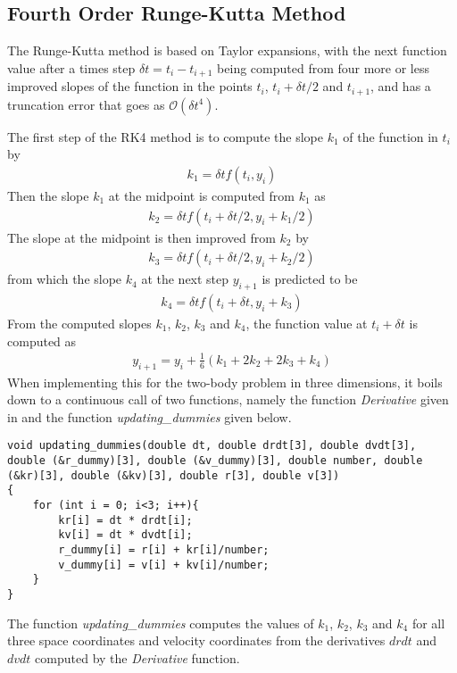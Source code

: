 \subsection{Fourth Order Runge-Kutta Method}
\label{sec:methodRK4}
The Runge-Kutta method is based on Taylor expansions, with the next function value after a times step $\delta t = t_i - t_{i+1}$ being computed from four more or less improved slopes of the function in the points $t_i$, $t_i + \delta t /2$ and $t_{i+1}$, and has a truncation error that goes as $\mathcal{O}(\delta t^4)$. \cite[p. 252]{CompLectureNotes}
  
The first step of the RK4 method is to compute the slope $k_1$ of the function in $t_i$ by
\begin{align*}
	k_1 = \delta t f(t_i , y_i)
\end{align*}
Then the slope $k_1$ at the midpoint is computed from $k_1$ as
\begin{align*}
	k_2 = \delta t f(t_i + \delta t /2, y_i + k_1 /2 )
\end{align*}
The slope at the midpoint is then improved from $k_2$ by
\begin{align*}
	k_3 = \delta t f(t_i + \delta t /2, y_i + k_2 /2 )
\end{align*}
from which the slope $k_4$ at the next step $y_{i+1}$ is predicted to be
\begin{align*}
	k_4 = \delta t f(t_i + \delta t, y_i +k_3 )
\end{align*}
From the computed slopes $k_1$, $k_2$, $k_3$ and $k_4$, the function value at $t_i + \delta t$ is computed as
\begin{align}
 y_{i+1} = y_i + \frac{1}{6} (k_1 + 2k_2 + 2k_3 +k_4 )
 \label{eq:RK4nextxtep1}
\end{align}
When implementing this for the two-body problem in three dimensions, it boils down to a continuous call of two functions, namely the function 
\textit{Derivative} given in 
 and the function 
\textit{updating\_dummies} given below.
\begin{lstlisting}
void updating_dummies(double dt, double drdt[3], double dvdt[3], double (&r_dummy)[3], double (&v_dummy)[3], double number, double (&kr)[3], double (&kv)[3], double r[3], double v[3])
{
    for (int i = 0; i<3; i++){
        kr[i] = dt * drdt[i];
        kv[i] = dt * dvdt[i];
        r_dummy[i] = r[i] + kr[i]/number;
        v_dummy[i] = v[i] + kv[i]/number;
    }
}
\end{lstlisting}
The function \textit{updating\_dummies} computes the values of $k_1$, $k_2$, $k_3$ and $k_4$ for all three space coordinates and velocity coordinates from the derivatives $drdt$ and $dvdt$ computed by the \textit{Derivative} function. 
